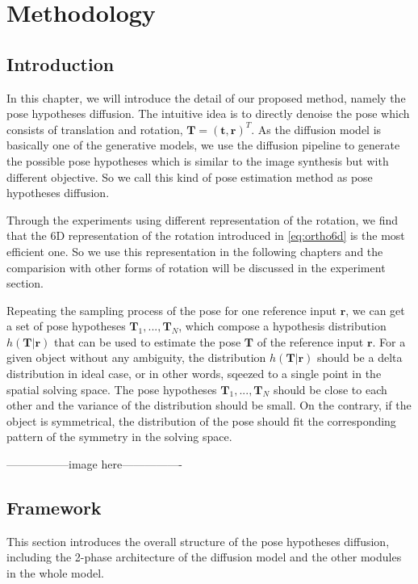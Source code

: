 \documentclass[12pt,DIV14,BCOR12mm,a4paper,footinclude=false,headinclude,parskip=half-,twoside,openright,cleardoublepage=empty,toc=index,bibliography=totoc,listof=totoc]{scrreprt}
\numberwithin{equation}{chapter}
\begin{document}
\chapter{Methodology}

\section{Introduction}
In this chapter, we will introduce the detail of our proposed method, namely the pose hypotheses diffusion. The intuitive idea is to directly denoise the pose which consists of translation and rotation, $\mathbf{T} = (\mathbf{t}, \mathbf{r})^{T}$. As the diffusion model is basically one of the generative models, we use the diffusion pipeline to generate the possible pose hypotheses which is similar to the image synthesis but with different objective. So we call this kind of pose estimation method as pose hypotheses diffusion.

Through the experiments using different representation of the rotation, we find that the 6D representation of the rotation introduced in \ref{eq:ortho6d} is the most efficient one. So we use this representation in the following chapters and the comparision with other forms of rotation will be discussed in the experiment section.

Repeating the sampling process of the pose for one reference input $\mathbf{r}$, we can get a set of pose hypotheses $\mathbf{T}_{1},...,\mathbf{T}_{N}$, which compose a hypothesis distribution $h(\mathbf{T}|\mathbf{r})$ that can be used to estimate the pose $\mathbf{T}$ of the reference input $\mathbf{r}$. For a given object without any ambiguity, the distribution $h(\mathbf{T}|\mathbf{r})$ should be a delta distribution in ideal case, or in other words, sqeezed to a single point in the spatial solving space. The pose hypotheses $\mathbf{T}_{1},...,\mathbf{T}_{N}$ should be close to each other and the variance of the distribution should be small. On the contrary, if the object is symmetrical, the distribution of the pose should fit the corresponding pattern of the symmetry in the solving space.

-----------------image here----------------

\section{Framework}
This section introduces the overall structure of the pose hypotheses diffusion, including the 2-phase architecture of the diffusion model and the other modules in the whole model.
\end{document}
